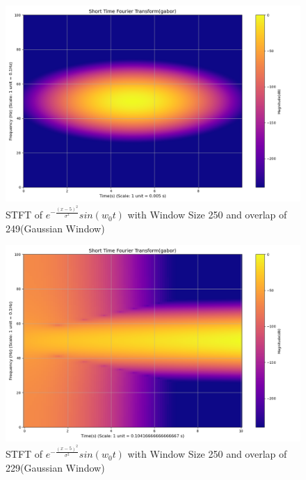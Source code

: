 \documentclass[12pt,a4paper,onecolumn]{exam}
\begin{document}
\begin{solution}
\begin{itemize}
\begin{itemize}
        \begin{figure}[H]
        \centering
        \includegraphics[scale = 0.35]{Gau_Win_gabor_1_250.0.png}
        \caption{STFT of $e^{-\frac{(x-5)^2}{\sigma^2}}sin(w_0t)$ with Window Size 250 and overlap of 249(Gaussian Window)}
        \label{fig:23}
        \end{figure}

        \begin{figure}[H]
        \centering
        \includegraphics[scale = 0.35]{Gau_Win_gabor_21_250.0.png}
        \caption{STFT of $e^{-\frac{(x-5)^2}{\sigma^2}}sin(w_0t)$ with Window Size 250 and overlap of 229(Gaussian Window)}
        \label{fig:24}
        \end{figure}
    
    \end{itemize}


\end{itemize}
\end{solution}
\end{document}
